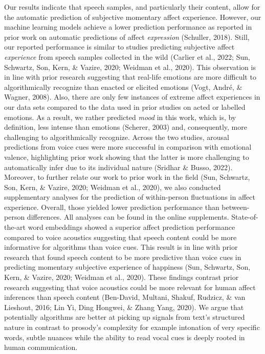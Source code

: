 \documentclass[
  english,
  man,floatsintext]{apa6}
\begin{document}
Our results indicate that speech samples, and particularly their content, allow for the automatic prediction of subjective momentary affect experience. However, our machine learning models achieve a lower prediction performance as reported in prior work on automatic predictions of affect \emph{expression} (Schuller, 2018). Still, our reported performance is similar to studies predicting subjective affect \emph{experience} from speech samples collected in the wild (Carlier et al., 2022; Sun, Schwartz, Son, Kern, \& Vazire, 2020; Weidman et al., 2020). This observation is in line with prior research suggesting that real-life emotions are more difficult to algorithmically recognize than enacted or elicited emotions (Vogt, André, \& Wagner, 2008). Also, there are only few instances of extreme affect experiences in our data sets compared to the data used in prior studies on acted or labelled emotions. As a result, we rather predicted \emph{mood} in this work, which is, by definition, less intense than emotions (Scherer, 2003) and, consequently, more challenging to algorithmically recognize.
Across the two studies, arousal predictions from voice cues were more successful in comparison with emotional valence, highlighting prior work showing that the latter is more challenging to automatically infer due to its individual nature (Sridhar \& Busso, 2022). Moreover, to further relate our work to prior work in the field (Sun, Schwartz, Son, Kern, \& Vazire, 2020; Weidman et al., 2020), we also conducted supplementary analyses for the prediction of within-person fluctuations in affect experience. Overall, those yielded lower prediction performance than between-person differences. All analyses can be found in the online supplements.
State-of-the-art word embeddings showed a superior affect prediction performance compared to voice acoustics suggesting that speech content could be more informative for algorithms than voice cues. This result is in line with prior research that found speech content to be more predictive than voice cues in predicting momentary subjective experience of happiness (Sun, Schwartz, Son, Kern, \& Vazire, 2020; Weidman et al., 2020). These findings contrast prior research suggesting that voice acoustics could be more relevant for human affect inferences than speech content (Ben-David, Multani, Shakuf, Rudzicz, \& van Lieshout, 2016; Lin Yi, Ding Hongwei, \& Zhang Yang, 2020). We argue that potentially algorithms are better at picking up signals from text's structured nature in contrast to prosody's complexity for example intonation of very specific words, subtle nuances while the ability to read vocal cues is deeply rooted in human communication.
\end{document}

